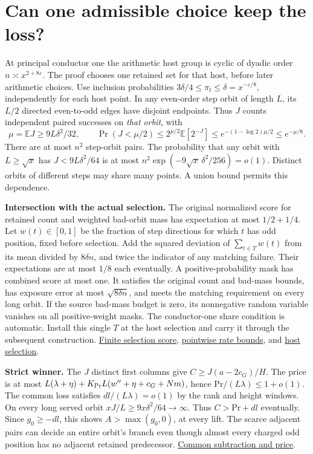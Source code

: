 \documentclass[12pt,letterpaper]{article}
\newcommand{\orig}[3]{\href{https://github.com/nousentllc/riemann-hypothesis/blob/40e56bab026552e089d7afcfeff08d2defb9c005/src/#1.lean\#L#2}{#3}}
\newcommand{\para}[1]{\par\medskip\noindent\textbf{#1}\quad}
\newcommand{\pagepart}[1]{\clearpage\section{#1}}
\begin{document}
\pagepart{Can one admissible choice keep the loss?}
At principal conductor one the arithmetic host group is cyclic of dyadic order \(n\asymp x^{2+8\varepsilon}\). The proof chooses one retained set for that host, before later arithmetic choices. Use inclusion probabilities \(3\delta/4\le\pi_t\le\delta=x^{-\varepsilon/8}\), independently for each host point. In any even-order step orbit of length \(L\), its \(L/2\) directed even-to-odd edges have disjoint endpoints. Thus \(J\) counts independent paired successes on \emph{that orbit}, with
\[
 \mu=\mathbb E J\ge9L\delta^2/32,\qquad
 \Pr(J<\mu/2)\le 2^{\mu/2}\mathbb E[2^{-J}]
 \le e^{-(1-\log 2)\mu/2}\le e^{-\mu/8}.
\]
There are at most \(n^2\) step-orbit pairs. The probability that any orbit with \(L\ge\sqrt x\) has \(J<9L\delta^2/64\) is at most \(n^2\exp(-9\sqrt x\,\delta^2/256)=o(1)\). Distinct orbits of different steps may share many points. A union bound permits this dependence.

\para{Intersection with the actual selection.} The original normalized score for retained count and weighted bad-orbit mass has expectation at most \(1/2+1/4\). Let \(w(t)\in[0,1]\) be the fraction of step directions for which \(t\) has odd position, fixed before selection. Add the squared deviation of \(\sum_{t\in T}w(t)\) from its mean divided by \(8\delta n\), and twice the indicator of any matching failure. Their expectations are at most \(1/8\) each eventually. A positive-probability mask has combined score at most one. It satisfies the original count and bad-mass bounds, has exposure error at most \(\sqrt{8\delta n}\), and meets the matching requirement on every long orbit. If the source bad-mass budget is zero, its nonnegative random variable vanishes on all positive-weight masks. The conductor-one share condition is automatic. Install this single \(T\) at the host selection and carry it through the subsequent construction.
\orig{Development/AutomorphicArithmetic/ThickFrames/select}{135}{Finite selection score},
\orig{Development/AutomorphicArithmetic/ThickFrames/NotGoodLe}{84}{pointwise rate bounds}, and
\orig{Development/AutomorphicArithmetic/ShortNorms/hostOfFieldOf}{217}{host selection}.

\para{Strict winner.} The \(J\) distinct first columns give \(C\ge J(a-2c_G)/H\). The price is at most \(L(\lambda+\eta)+K_{\rm Pr}L(w''+\eta+c_G+Nm)\), hence \(\mathrm{Pr}/(L\lambda)\le1+o(1)\). The common loss satisfies \(dl/(L\lambda)=o(1)\) by the rank and height windows. On every long served orbit \(xJ/L\ge9x\delta^2/64\to\infty\). Thus \(C>\mathrm{Pr}+dl\) eventually. Since \(g_0\ge-dl\), this shows \(A>\max(g_0,0)\), at every lift. The scarce adjacent pairs can decide an entire orbit's branch even though almost every charged odd position has no adjacent retained predecessor.
\orig{Formalism/SharpRestriction/GrowthBounds/IsResidueClassZero}{241}{Common subtraction and price}.
\end{document}
